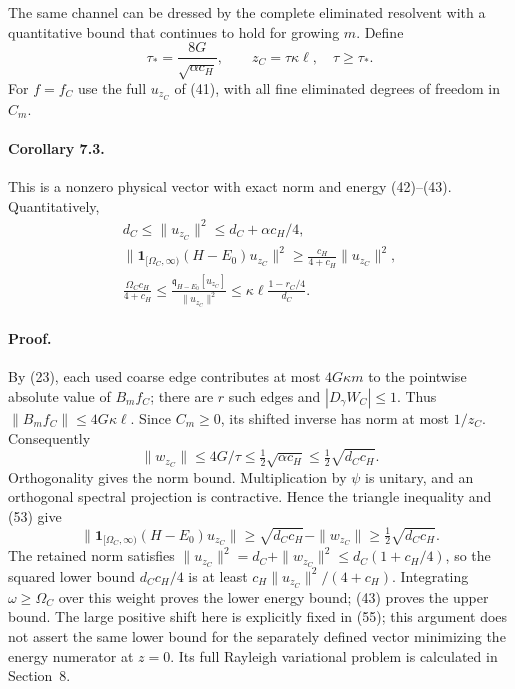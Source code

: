 \documentclass[11pt]{article}
\begin{document}
The same channel can be dressed by the complete eliminated resolvent
with a quantitative bound that continues to hold for growing $m$.
Define
\begin{equation}\label{eq:tau}
 \tau_* =\frac{8G}{\sqrt{\alpha c_H}},\qquad
 z_C=\tau\kappa\ell,\quad\tau\geq\tau_*.
\end{equation}
For $f=f_C$ use the full $u_{z_C}$ of (41), with all
fine eliminated degrees of freedom in $C_m$.
\paragraph{Corollary 7.3.}
This is a nonzero physical vector with exact norm and energy
(42)--(43). Quantitatively,
\begin{gather}
 d_C\leq\|u_{z_C}\|^2\leq d_C+\alpha c_H/4,\nonumber\\
 \|\mathbf1_{[\Omega_C,\infty)}(H-E_0)u_{z_C}\|^2
 \geq\frac{c_H}{4+c_H}\|u_{z_C}\|^2,\label{eq:dressedweight}\\
 \frac{\Omega_Cc_H}{4+c_H}
 \leq\frac{\mathfrak q_{H-E_0}[u_{z_C}]}{\|u_{z_C}\|^2}
 \leq\kappa\ell\frac{1-r_C/4}{d_C}.
\end{gather}

\paragraph{Proof.}
By (23), each used coarse edge contributes at
most $4G\kappa m$ to the pointwise absolute value of $B_mf_C$;
there are $r$ such edges and $|D_\gamma W_C|\leq1$.
Thus $\|B_mf_C\|\leq4G\kappa\ell$.
Since $C_m\geq0$, its shifted inverse has norm at most $1/z_C$.
Consequently
\[
 \|w_{z_C}\|\leq4G/\tau\leq\tfrac12\sqrt{\alpha c_H}
                              \leq\tfrac12\sqrt{d_Cc_H}.
\]
Orthogonality gives the norm bound. Multiplication by $\psi$ is unitary,
and an orthogonal spectral projection is contractive. Hence the triangle
inequality and (53) give
\[
 \|\mathbf1_{[\Omega_C,\infty)}(H-E_0)u_{z_C}\|
 \geq\sqrt{d_Cc_H}-\|w_{z_C}\|
 \geq\tfrac12\sqrt{d_Cc_H}.
\]
The retained norm satisfies
$\|u_{z_C}\|^2=d_C+\|w_{z_C}\|^2\leq d_C(1+c_H/4)$,
so the squared lower bound $d_Cc_H/4$ is at least
$c_H\|u_{z_C}\|^2/(4+c_H)$.
Integrating $\omega\geq\Omega_C$ over this weight proves the lower
energy bound; (43) proves the upper bound.
The large positive shift here is explicitly fixed in (55);
this argument does not assert the same lower bound for the separately
defined vector minimizing the energy numerator at $z=0$. Its full
Rayleigh variational problem is calculated in Section~8.
\end{document}
